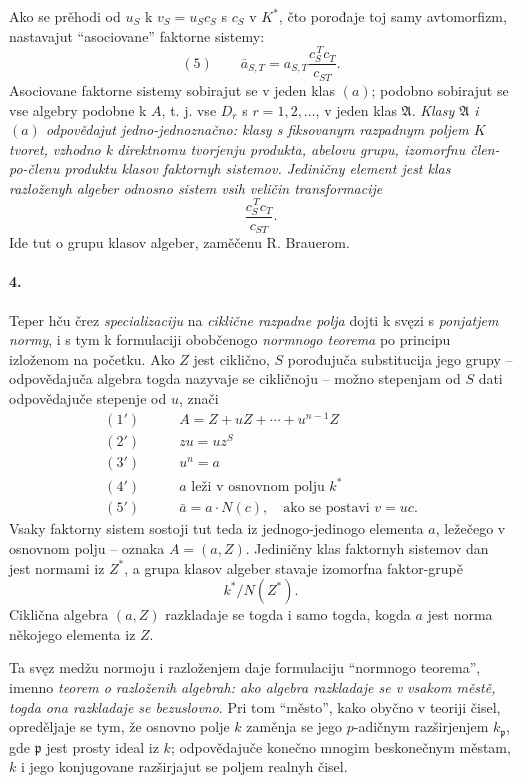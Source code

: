 \documentclass[11pt]{article}
\begin{document}
Ako se prěhodi od \(u_S\) k \(v_S=u_Sc_S\) s \(c_S\) v \(K^\ast\), čto porođaje toj samy avtomorfizm, nastavajut ``asociovane'' faktorne sistemy:
\[
(5)\qquad \bar a_{S,T}=a_{S,T}\frac{c_S^{\,T}c_T}{c_{ST}}.
\]
Asociovane faktorne sistemy sobirajut se v jeden klas \((a)\); podobno sobirajut se vse algebry podobne k \(A\), t. j. vse \(D_r\) s \(r=1,2,\ldots\), v jeden klas \(\mathfrak A\). \emph{Klasy \(\mathfrak A\) i \((a)\) odpovědajut jedno-jednoznačno: klasy s fiksovanym razpadnym poljem \(K\) tvoret, vzhodno k direktnomu tvorjenju produkta, abelovu grupu, izomorfnu člen-po-členu produktu klasov faktornyh sistemov. Jediničny element jest klas razloženyh algeber odnosno sistem vsih veličin transformacije}
\[
        \frac{c_S^{\,T}c_T}{c_{ST}}.
\]
Ide tut o grupu klasov algeber, zaměčenu R. Brauerom.

\paragraph{4.}
Teper hču črez \emph{specializaciju} na \emph{ciklične razpadne polja} dojti k svęzi s \emph{ponjatjem normy}, i s tym k formulaciji obobčenogo \emph{normnogo teorema} po principu izloženom na početku. Ako \(Z\) jest ciklično, \(S\) porođujuča substitucija jego grupy -- odpovědajuča algebra togda nazyvaje se cikličnoju -- možno stepenjam od \(S\) dati odpovědajuče stepenje od \(u\), znači
\[
\begin{aligned}
(1')\qquad &A=Z+uZ+\cdots+u^{n-1}Z\\
(2')\qquad &zu=uz^S\\
(3')\quad &u^n=a\\
(4')\quad &a\text{ leži v osnovnom polju }k^\ast\\
(5')\quad &\bar a=a\cdot N(c),\quad \text{ako se postavi }v=uc.
\end{aligned}
\]
Vsaky faktorny sistem sostoji tut teda iz jednogo-jedinogo elementa \(a\), ležečego v osnovnom polju -- oznaka \(A=(a,Z)\). Jediničny klas faktornyh sistemov dan jest normami iz \(Z^\ast\), a grupa klasov algeber stavaje izomorfna faktor-grupě
\[
        k^\ast/N(Z^\ast).
\]
Ciklična algebra \((a,Z)\) razkladaje se togda i samo togda, kogda \(a\) jest norma někojego elementa iz \(Z\).

Ta svęz medžu normoju i razloženjem daje formulaciju ``normnogo teorema'', imenno \emph{teorem o razloženih algebrah: ako algebra razkladaje se v vsakom městě, togda ona razkladaje se bezuslovno}. Pri tom ``město'', kako obyčno v teoriji čisel, opreděljaje se tym, že osnovno polje \(k\) zaměnja se jego \(p\)-adičnym razširjenjem \(k_{\mathfrak p}\), gde \(\mathfrak p\) jest prosty ideal iz \(k\); odpovědajuče konečno mnogim beskonečnym městam, \(k\) i jego konjugovane razširjajut se poljem realnyh čisel.
\end{document}
